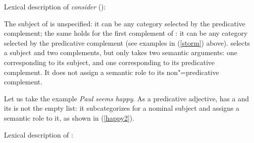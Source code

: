 \eas
Lexical description of \emph{consider} ():\\
\zs

	
The subject of  is unspecified: it can be any category selected by the predicative
complement; the same holds for the first complement of :
it can be any category
selected by the predicative complement (see examples in (\ref{storm}) above).   selects
a subject and two complements, but only takes two semantic arguments: one corresponding to its
subject, and one corresponding to its predicative complement. It does not assign a semantic role to
its non"=predicative complement.

Let us take the example \textit{Paul seems happy}. As a predicative adjective,  has a
\headf [\prd $+$] and its \subjf is not the empty list: it subcategorizes for a nominal subject and
assigns a semantic role to it, as shown in (\ref{happy2}).
	
\eas
\label{happy2}%
Lexical description of :\\
\zs

